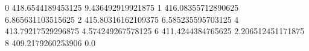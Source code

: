0 418.6544189453125 9.436492919921875
1 416.08355712890625 6.865631103515625
2 415.80316162109375 6.585235595703125
4 413.79217529296875 4.574249267578125
6 411.4244384765625 2.206512451171875
8 409.2179260253906 0.0
